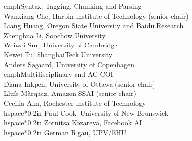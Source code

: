 emph{Syntax: Tagging, Chunking and Parsing} \\
\hspace*{0.2in} Wanxiang Che, Harbin Institute of Technology (senior chair)\\
\hspace*{0.2in} Liang Huang, Oregon State University and Baidu Research\\
\hspace*{0.2in} Zhenghua Li, Soochow University\\
\hspace*{0.2in} Weiwei Sun, University of Cambridge\\
\hspace*{0.2in} Kewei Tu, ShanghaiTech University\\
\hspace*{0.2in} Anders Søgaard, University of Copenhagen\\

emph{Multidisciplinary and AC COI} \\
\hspace*{0.2in} Diana Inkpen, University of Ottawa (senior chair)\\
\hspace*{0.2in} Lluís Màrquez, Amazon SSAI (senior chair)\\
\hspace*{0.2in} Cecilia Alm, Rochester Institute of Technology\\
hspace*{0.2in} Paul Cook, University of New Brunswick\\
hspace*{0.2in} Zornitsa Kozareva, Facebook AI\\
hspace*{0.2in} German Rigau, UPV/EHU\\
